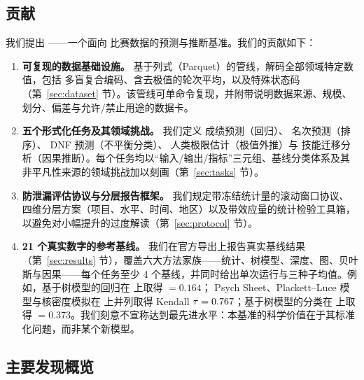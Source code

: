 \subsection{贡献}
\label{sec:contributions}

我们提出 \wcabench{}——一个面向 \wca{} 比赛数据的预测与推断基准。我们的贡献如下：

\begin{enumerate}
  \item \textbf{可复现的数据基础设施。} 基于列式（Parquet）的管线，解码全部领域特定数值，包括 \wca{} 多盲复合编码、含去极值的轮次平均，以及特殊状态码（第~\ref{sec:dataset} 节）。该管线可单命令复现，并附带说明数据来源、规模、划分、偏差与允许/禁止用途的数据卡。

  \item \textbf{五个形式化任务及其领域挑战。} 我们定义  成绩预测（回归）、 名次预测（排序）、 DNF 预测（不平衡分类）、 人类极限估计（极值外推）与  技能迁移分析（因果推断）。每个任务均以“输入/输出/指标”三元组、基线分类体系及其非平凡性来源的领域挑战加以刻画（第~\ref{sec:tasks} 节）。

  \item \textbf{防泄漏评估协议与分层报告框架。} 我们规定带冻结统计量的滚动窗口协议、四维分层方案（项目、水平、时间、地区）以及带效应量的统计检验工具箱，以避免对小幅提升的过度解读（第~\ref{sec:protocol} 节）。

  \item \textbf{21 个真实数字的参考基线。} 我们在官方导出上报告真实基线结果（第~\ref{sec:results} 节），覆盖六大方法家族——统计、树模型、深度、图、贝叶斯与因果——每个任务至少 4 个基线，并同时给出单次运行与三种子均值。例如，基于树模型的回归在  上取得 \maelog{} $=0.164$；\wca{} Psych Sheet、Plackett--Luce 模型与核密度模拟在  上并列取得 Kendall $\tau=0.767$；基于树模型的分类在  上取得 \aucpr{} $=0.373$。我们刻意不宣称达到最先进水平：本基准的科学价值在于其标准化问题，而非某个新模型。
\end{enumerate}

\subsection{主要发现概览}
\label{sec:findings}

